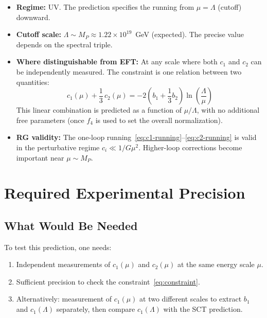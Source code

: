 \documentclass[11pt,a4paper]{article}
\begin{document}
\begin{itemize}[leftmargin=2em]
  \item \textbf{Regime:} UV. The prediction specifies the running from $\mu = \Lambda$ (cutoff) downward.
  \item \textbf{Cutoff scale:} $\Lambda \sim M_P \approx 1.22 \times 10^{19}$~GeV (expected). The precise value depends on the spectral triple.
  \item \textbf{Where distinguishable from EFT:} At any scale where both $c_1$ and $c_2$ can be independently measured. The constraint is one relation between two quantities:
    \begin{equation}
      c_1(\mu) + \frac{1}{3}\,c_2(\mu) = -2\left(b_1 + \frac{1}{3}b_2\right)\ln\!\left(\frac{\Lambda}{\mu}\right)
      \label{eq:constraint}
    \end{equation}
    This linear combination is predicted as a function of $\mu/\Lambda$, with no additional free parameters (once $f_4$ is used to set the overall normalization).
  \item \textbf{RG validity:} The one-loop running~\eqref{eq:c1-running}--\eqref{eq:c2-running} is valid in the perturbative regime $c_i \ll 1/G\mu^2$. Higher-loop corrections become important near $\mu \sim M_P$.
\end{itemize}

\section{Required Experimental Precision}

\subsection{What Would Be Needed}

To test this prediction, one needs:
\begin{enumerate}
  \item Independent measurements of $c_1(\mu)$ and $c_2(\mu)$ at the same energy scale $\mu$.
  \item Sufficient precision to check the constraint~\eqref{eq:constraint}.
  \item Alternatively: measurement of $c_1(\mu)$ at two different scales to extract $b_1$ and $c_1(\Lambda)$ separately, then compare $c_1(\Lambda)$ with the SCT prediction.
\end{enumerate}
\end{document}
